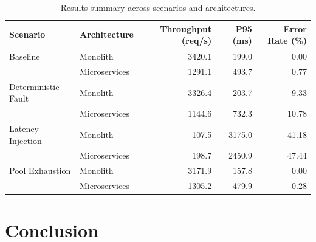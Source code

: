 \documentclass[smallextended,natbib]{svjour3}
\begin{document}
\begin{table}[ht]
	\caption{Results summary across scenarios and architectures.}
	\label{tab-results-summary}
	\centering
	\begin{tabular}{l l r r r}
		\toprule
		\textbf{Scenario}   & \textbf{Architecture} & \textbf{Throughput} (req/s) & \textbf{P95} (ms) & \textbf{Error Rate} (\%) \\
		\midrule
		Baseline            & Monolith              & 3420.1                      & 199.0             & 0.00                     \\
		                    & Microservices         & 1291.1                      & 493.7             & 0.77                     \\
		Deterministic Fault & Monolith              & 3326.4                      & 203.7             & 9.33                     \\
		                    & Microservices         & 1144.6                      & 732.3             & 10.78                    \\
		Latency Injection   & Monolith              & 107.5                       & 3175.0            & 41.18                    \\
		                    & Microservices         & 198.7                       & 2450.9            & 47.44                    \\
		Pool Exhaustion     & Monolith              & 3171.9                      & 157.8             & 0.00                     \\
		                    & Microservices         & 1305.2                      & 479.9             & 0.28                     \\
		\bottomrule
	\end{tabular}
\end{table}

\section{Conclusion}\label{sec-conclusion}
\end{document}
